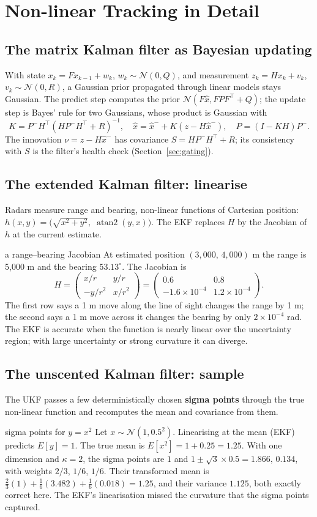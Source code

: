 \documentclass[11pt]{article}
\begin{document}
\section{Non-linear Tracking in Detail}
\subsection{The matrix Kalman filter as Bayesian updating}
With state $x_k=Fx_{k-1}+w_k$, $w_k\sim\mathcal N(0,Q)$, and measurement $z_k=Hx_k+v_k$, $v_k\sim\mathcal N(0,R)$, a Gaussian prior propagated through linear models stays Gaussian. The predict step computes the prior $\mathcal N(F\hat x,FPF^\top+Q)$; the update step is Bayes' rule for two Gaussians, whose product is Gaussian with
\[K=P^-H^\top(HP^-H^\top+R)^{-1},\quad\hat x=\hat x^-+K(z-H\hat x^-),\quad P=(I-KH)P^-.\]
The innovation $\nu=z-H\hat x^-$ has covariance $S=HP^-H^\top+R$; its consistency with $S$ is the filter's health check (Section~\ref{sec:gating}).
\subsection{The extended Kalman filter: linearise}
Radars measure range and bearing, non-linear functions of Cartesian position: $h(x,y)=\big(\sqrt{x^2+y^2},\;\operatorname{atan2}(y,x)\big)$. The EKF replaces $H$ by the Jacobian of $h$ at the current estimate.
\begin{example}{a range--bearing Jacobian}
At estimated position $(3{,}000,\,4{,}000)$ m the range is 5,000 m and the bearing $53.13^\circ$. The Jacobian is
\[H=\begin{pmatrix}x/r&y/r\\-y/r^2&x/r^2\end{pmatrix}=\begin{pmatrix}0.6&0.8\\-1.6\times10^{-4}&1.2\times10^{-4}\end{pmatrix}.\]
The first row says a 1 m move along the line of sight changes the range by 1 m; the second says a 1 m move across it changes the bearing by only $2\times10^{-4}$ rad. The EKF is accurate when the function is nearly linear over the uncertainty region; with large uncertainty or strong curvature it can diverge.
\end{example}
\subsection{The unscented Kalman filter: sample}
The UKF passes a few deterministically chosen \textbf{sigma points} through the true non-linear function and recomputes the mean and covariance from them.
\begin{example}{sigma points for $y=x^2$}
Let $x\sim\mathcal N(1,0.5^2)$. Linearising at the mean (EKF) predicts $E[y]=1$. The true mean is $E[x^2]=1+0.25=1.25$. With one dimension and $\kappa=2$, the sigma points are $1$ and $1\pm\sqrt3\times0.5=1.866,\,0.134$, with weights $2/3$, $1/6$, $1/6$. Their transformed mean is $\frac23(1)+\frac16(3.482)+\frac16(0.018)=1.25$, and their variance $1.125$, both exactly correct here. The EKF's linearisation missed the curvature that the sigma points captured.
\end{example}
\end{document}
